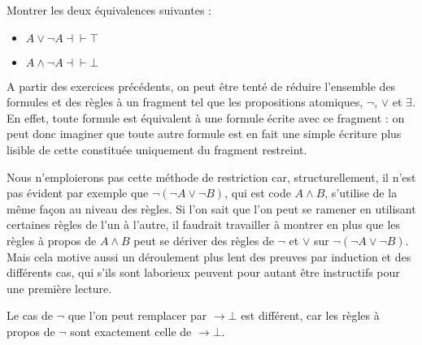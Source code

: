 \begin{exercise}
  Montrer les deux équivalences suivantes :
  \begin{itemize}
  \item $A \lor \lnot A \dashv\vdash \top$
  \item $A \land \lnot A \dashv\vdash \bot$
  \end{itemize}
\end{exercise}

\begin{remark}
  A partir des exercices précédents, on peut être tenté de réduire l'ensemble
  des formules et des règles à un fragment tel que les propositions atomiques,
  $\lnot$, $\lor$ et $\exists$. En effet, toute formule est équivalent à une
  formule écrite avec ce fragment : on peut donc imaginer que toute autre
  formule est en fait une simple écriture plus lisible de cette constituée
  uniquement du fragment restreint.

  Nous n'emploierons pas cette méthode de restriction car, structurellement,
  il n'est pas évident par exemple que $\lnot (\lnot A \lor \lnot B)$, qui
  est code $A \land B$, s'utilise de la même façon au niveau des règles. Si l'on
  sait que l'on peut se ramener en utilisant certaines règles de l'un à l'autre,
  il faudrait travailler à montrer en plus que les règles à propos de $A\land B$
  peut se dériver des règles de $\lnot$ et $\lor$ sur
  $\lnot (\lnot A \lor \lnot B)$. Mais cela motive aussi un déroulement plus
  lent des preuves par induction et des différents cas, qui s'ils sont
  laborieux peuvent pour autant être instructifs pour une première lecture.

  Le cas de $\lnot$ que l'on peut remplacer par $\to \bot$ est différent, car
  les règles à propos de $\lnot$ sont exactement celle de $\to \bot$.
\end{remark}

